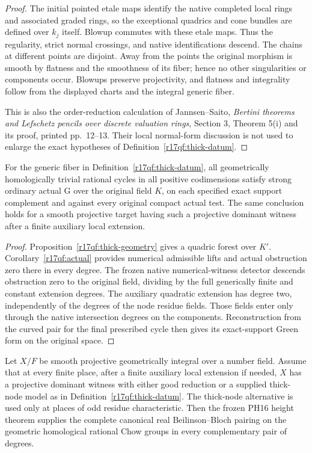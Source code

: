 \begin{proof}
The initial pointed etale maps identify the native completed
local rings and associated graded rings, so the exceptional
quadrics and cone bundles are defined over $k_j$ itself.
Blowup commutes with these etale maps.  Thus the regularity,
strict normal crossings, and native identifications descend.
The chains at different points are disjoint.  Away from the
points the original morphism is smooth by flatness and the
smoothness of its fiber; hence no other singularities or
components occur.  Blowups preserve projectivity, and
flatness and integrality follow from the displayed charts
and the integral generic fiber.

This is also the order-reduction calculation of
Jannsen--Saito, \emph{Bertini theorems and Lefschetz pencils
over discrete valuation rings}, Section 3, Theorem 5(i)
and its proof, printed pp.~12--13.  Their local normal-form
discussion is not used to enlarge the exact hypotheses
of Definition~\ref{r17qf:thick-datum}.
\end{proof}

\begin{theorem}
\label{r17qf:thick-actual}
For the generic fiber in Definition~\ref{r17qf:thick-datum},
all geometrically homologically trivial rational cycles in
all positive codimensions satisfy strong ordinary actual G
over the original field $K$, on each specified exact support
complement and against every original compact actual test.
The same conclusion holds for a smooth projective target
having such a projective dominant witness after a finite
auxiliary local extension.
\end{theorem}

\begin{proof}
Proposition~\ref{r17qf:thick-geometry} gives a quadric forest
over $K'$.  Corollary~\ref{r17qf:actual} provides numerical
admissible lifts and actual obstruction zero there in every
degree.  The frozen native numerical-witness detector
descends obstruction zero to the original field, dividing
by the full generically finite and constant extension
degrees.  The auxiliary quadratic extension has degree
two, independently of the degrees of the node residue
fields.  Those fields enter only through the native
intersection degrees on the components.  Reconstruction
from the curved pair for the final prescribed cycle then
gives its exact-support Green form on the original space.
\end{proof}

\begin{corollary}
\label{r17qf:global}
Let $X/F$ be smooth projective geometrically integral over
a number field.  Assume that at every finite place, after
a finite auxiliary local extension if needed, $X$ has a
projective dominant witness with either good reduction or
a supplied thick-node model as in
Definition~\ref{r17qf:thick-datum}.  The thick-node alternative
is used only at places of odd residue characteristic.
Then the frozen PH16 height theorem supplies the complete
canonical real Beilinson--Bloch pairing on the geometric
homological rational Chow groups in every complementary
pair of degrees.
\end{corollary}

